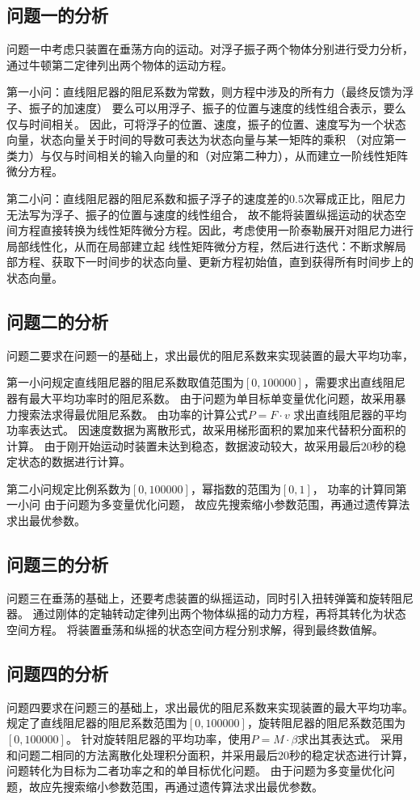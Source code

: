 \documentclass[withoutpreface,bwprint]{cumcmthesis} %
\begin{document}
    \subsection{问题一的分析}
    问题一中考虑只装置在垂荡方向的运动。对浮子振子两个物体分别进行受力分析，通过牛顿第二定律列出两个物体的运动方程。

    第一小问：直线阻尼器的阻尼系数为常数，则方程中涉及的所有力（最终反馈为浮子、振子的加速度）
    要么可以用浮子、振子的位置与速度的线性组合表示，要么仅与时间相关。
    因此，可将浮子的位置、速度，振子的位置、速度写为一个状态向量，状态向量关于时间的导数可表达为状态向量与某一矩阵的乘积
    （对应第一类力）与仅与时间相关的输入向量的和（对应第二种力），从而建立一阶线性矩阵微分方程。
    
    第二小问：直线阻尼器的阻尼系数和振子浮子的速度差的$0.5$次幂成正比，阻尼力无法写为浮子、振子的位置与速度的线性组合，
    故不能将装置纵摇运动的状态空间方程直接转换为线性矩阵微分方程。因此，考虑使用一阶泰勒展开对阻尼力进行局部线性化，从而在局部建立起
    线性矩阵微分方程，然后进行迭代：不断求解局部方程、获取下一时间步的状态向量、更新方程初始值，直到获得所有时间步上的状态向量。
    \subsection{问题二的分析}
    问题二要求在问题一的基础上，求出最优的阻尼系数来实现装置的最大平均功率，

    第一小问规定直线阻尼器的阻尼系数取值范围为$[0,100000]$，需要求出直线阻尼器有最大平均功率时的阻尼系数。
    由于问题为单目标单变量优化问题，故采用暴力搜索法求得最优阻尼系数。
    由功率的计算公式$P=F\cdot v$ 求出直线阻尼器的平均功率表达式。
    因速度数据为离散形式，故采用梯形面积的累加来代替积分面积的计算。
    由于刚开始运动时装置未达到稳态，数据波动较大，故采用最后$20$秒的稳定状态的数据进行计算。

    第二小问规定比例系数为$[0,100000]$，幂指数的范围为$[0,1]$，
    功率的计算同第一小问
    由于问题为多变量优化问题，
    故应先搜索缩小参数范围，再通过遗传算法求出最优参数。

    \subsection{问题三的分析}
    问题三在垂荡的基础上，还要考虑装置的纵摇运动，同时引入扭转弹簧和旋转阻尼器。
    通过刚体的定轴转动定律列出两个物体纵摇的动力方程，再将其转化为状态空间方程。
    将装置垂荡和纵摇的状态空间方程分别求解，得到最终数值解。
    \subsection{问题四的分析}
    问题四要求在问题三的基础上，求出最优的阻尼系数来实现装置的最大平均功率。
    规定了直线阻尼器的阻尼系数范围为$[0,100000]$，旋转阻尼器的阻尼系数范围为$[0,100000]$。
    针对旋转阻尼器的平均功率，使用$P = M\cdot \beta$求出其表达式。
    采用和问题二相同的方法离散化处理积分面积，并采用最后$20$秒的稳定状态进行计算，
    问题转化为目标为二者功率之和的单目标优化问题。
    由于问题为多变量优化问题，故应先搜索缩小参数范围，再通过遗传算法求出最优参数。
\end{document}
